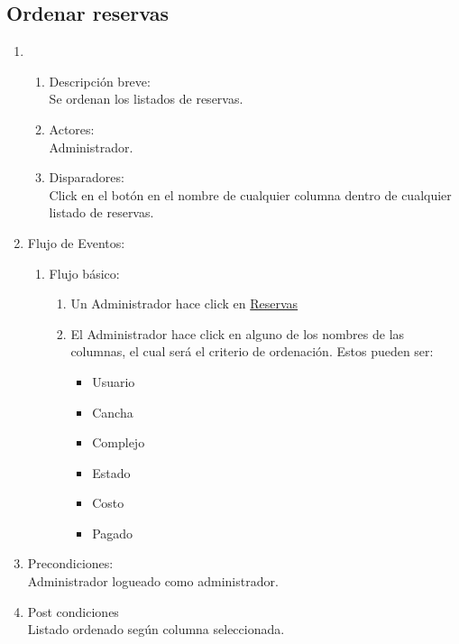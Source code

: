 \documentclass[a4paper,11pt]{article}
\begin{document}
\subsection{Ordenar reservas}
\begin{enumerate}
    \item
    \begin{enumerate}
    \item Descripci\'on breve: \\
        Se ordenan los listados de reservas.
    \item Actores: \\
        Administrador.
    \item Disparadores: \\
        Click en el bot\'on en el nombre de cualquier columna
        dentro de cualquier listado de reservas.
    \end{enumerate}
    \item Flujo de Eventos: 
    \begin{enumerate}
        \item Flujo b\'asico:
	\begin{enumerate}
            	\item Un Administrador hace click en \underline{Reservas}
	    	\item El Administrador hace click en alguno de los nombres de las columnas, el cual ser\'a el criterio de ordenaci\'on. Estos pueden ser:
		\begin{itemize}
			\item Usuario
			\item Cancha
			\item Complejo
			\item Estado
			\item Costo
			\item Pagado
		\end{itemize}
	\end{enumerate}
	\end{enumerate}

    \item Precondiciones: \\
        Administrador logueado como administrador.
    \item Post condiciones \\
        Listado ordenado seg\'un columna seleccionada.
\end{enumerate}
\end{document}
